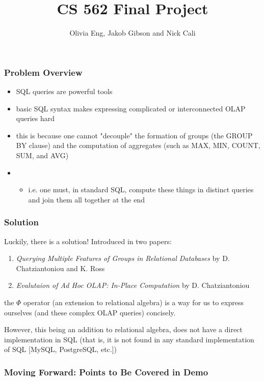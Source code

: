 \documentclass{beamer}
\title{CS 562 Final Project}
\author{Olivia Eng, Jakob Gibson and Nick Cali}
\date{}
\begin{document}
    \begin{frame}
        \begin{titlepage}
            
        \end{titlepage}
    \end{frame}

    \begin{frame}
        \frametitle[Overview]{Problem Overview}
        \begin{itemize}
            \item SQL queries are powerful tools
            \item basic SQL syntax makes expressing complicated or interconnected OLAP queries hard
            \item this is because one cannot "decouple" the formation of groups (the GROUP BY clause) and the computation of aggregates (such as MAX, MIN, COUNT, SUM, and AVG) 
            \item \begin{itemize}
                \item i.e. one must, in standard SQL, compute these things in distinct queries and join them all together at the end
            \end{itemize}
        \end{itemize}
    \end{frame}

    \begin{frame}
        \frametitle[Solution]{Solution}
        Luckily, there is a solution! Introduced in two papers:
        \begin{enumerate}
            \item \textit{Querying Multiple Features of Groups in Relational Databases} by D. Chatziantoniou and K. Ross
            \item \textit{Evalutaion of Ad Hoc OLAP: In-Place Computation} by D. Chatziantoniou
        \end{enumerate} 
        the $\varPhi$ operator (an extension to relational algebra) is a way for us to express ourselves (and these complex OLAP queries) concisely.\par
        However, this being an addition to relational algebra, does not have a direct implementation in SQL (that is, it is not found in any standard implementation of SQL [MySQL, PostgreSQL, etc.])
    \end{frame}

    \begin{frame}
        \frametitle[Demo Points]{Moving Forward: Points to Be Covered in Demo}
    \end{frame}
\end{document}
